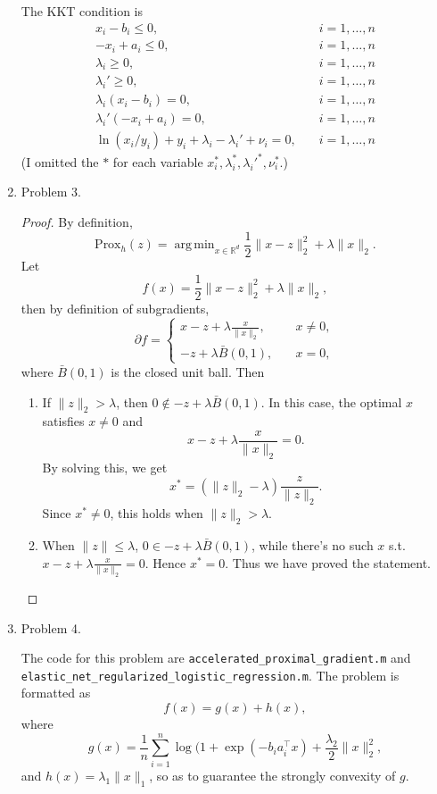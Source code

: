\documentclass{article}
\DeclareMathOperator*{\argmin}{arg\,min}
\begin{document}
\begin{enumerate}
The KKT condition is
$$
\begin{aligned}
x_i-b_i\le 0,& \quad i = 1, \hdots, n \\
-x_i+a_i\le 0,& \quad i = 1, \hdots, n \\
\lambda_i \ge 0,& \quad i = 1, \hdots, n \\
\lambda_i' \ge 0,& \quad i = 1, \hdots, n \\
\lambda_i(x_i-b_i) = 0,& \quad i = 1, \hdots, n \\
\lambda_i'(-x_i+a_i) = 0,& \quad i = 1, \hdots, n \\
\ln(x_i/y_i)+y_i+\lambda_i-\lambda_i'+\nu_i = 0,& \quad i = 1, \hdots, n
\end{aligned}
$$
(I omitted the $*$ for each variable $x_i^*, \lambda_i^*, \lambda_i'^*, \nu_i^* $.)

\item Problem 3.

\begin{proof}
By definition, 
$$
\text{Prox}_h(z) = \argmin_{x\in \mathbb{R}^d} \frac{1}{2}\lVert x-z\rVert_2^2 + \lambda\lVert x\rVert_2. 
$$
Let
$$
f(x) = \frac{1}{2}\lVert x-z\rVert_2^2 + \lambda\lVert x\rVert_2,
$$
then by definition of subgradients,
$$
\partial f = \left\{
\begin{aligned}
x-z+\lambda\frac{x}{\lVert x\rVert_2},& \quad x \ne 0, \\
-z+\lambda\bar{B}(0, 1),& \quad x = 0,
\end{aligned}
\right.
$$
where $\bar{B}(0, 1)$ is the closed unit ball. Then 
\begin{enumerate}
\item If $\lVert z\rVert_2 > \lambda $, then $0\notin -z+\lambda\bar{B}(0, 1)$. In this case, the optimal $x $ satisfies $x\ne 0$ and
$$
x - z+\lambda\frac{x}{\lVert x\rVert_2} = 0.
$$
By solving this, we get
$$
x^* = (\lVert z\rVert_2 - \lambda)\frac{z}{\lVert z\rVert_2}.
$$
Since $x^*\ne 0 $, this holds when $\lVert z\rVert_2 > \lambda $.

\item When $\lVert z\rVert \le \lambda$, $0\in -z+\lambda\bar{B}(0, 1)$, while there's no such $x$ s.t. $x - z+\lambda\frac{x}{\lVert x\rVert_2} = 0$. Hence $x^* = 0$. Thus we have proved the statement.
\end{enumerate}
\end{proof}

\item Problem 4.

The code for this problem are \texttt{accelerated\_proximal\_gradient.m} and \texttt{elastic\_net\_regularized\_logistic\_regression.m}. The problem is formatted as 
$$
f(x) = g(x)+h(x), 
$$
where 
$$
g(x) = \frac{1}{n}\sum_{i=1}^{n}\log(1+\exp(-b_ia_i^\top x) +\frac{\lambda_2}{2}\lVert x\rVert_2^2,
$$
and 
$h(x) = \lambda_1\lVert x\rVert_1 $, so as to guarantee the strongly convexity of $g$. 


\end{enumerate}
\end{document}

